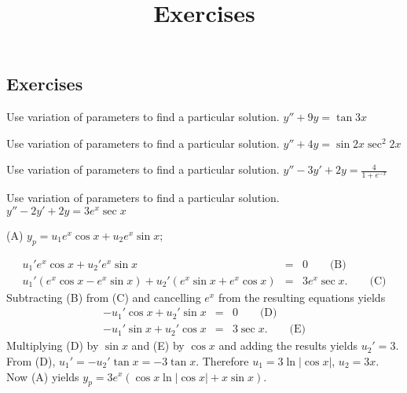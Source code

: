 \documentclass{ximera}
\title{Exercises} \license{CC BY-NC-SA 4.0}
\begin{document}
\begin{abstract}
\end{abstract}
\maketitle

\begin{onlineOnly}
\section*{Exercises}
\end{onlineOnly}


\begin{problem}\label{exer:5.7.1} Use variation of parameters to find a particular solution. $y''+9y=\tan 3x$
\end{problem}

\begin{problem}\label{exer:5.7.2} Use variation of parameters to find a particular solution. $y''+4y=\sin 2x\sec^2 2x$
\end{problem}

\begin{problem}\label{exer:5.7.3}  Use variation of parameters to find a particular solution. $y''-3y'+2y=\frac{4}{1+e^{-x}}$
\end{problem}

\begin{problem}\label{exer:5.7.4} Use variation of parameters to find a particular solution. $y''-2y'+2y=3e^x \sec x$

\begin{solution}
(A) $y_p=u_1e^x\cos x+u_2e^x\sin x$;

\begin{eqnarray*}
u_1'e^x\cos x+u_2'e^x\sin
x&=&0\qquad\text{(B)} \\ %
u_1'(e^x\cos x-e^x\sin x)+u_2'(e^x\sin x+e^x\cos x)&=&3e^x\sec x. \qquad\text{(C)}
\end{eqnarray*}
Subtracting (B)  from (C) and
cancelling  $e^x$ from the resulting equations yields
\begin{eqnarray*}
-u_1'\cos x+u_2'\sin x&=&0\qquad\text{(D)}\\ %
-u_1'\sin x+u_2'\cos x&=&3\sec x.\qquad\text{(E)} %
 \end{eqnarray*}
 Multiplying (D) by $\sin x$ and
 (E) by $\cos x$
and adding the results yields $u_2'=3$. From (D),
$u_1'=-u_2'\tan x=-3\tan x$. Therefore $u_1=3\ln|\cos x|$, $u_2=3x$.
Now (A) yields $y_p=3e^x(\cos x \ln |\cos x|+x\sin x)$.

\end{solution}
\end{problem}
\end{document}
